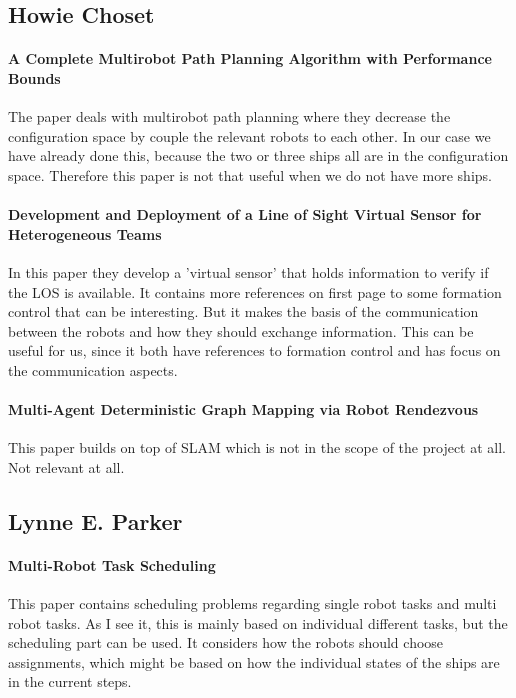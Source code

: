 \subsection{Howie Choset}

{\vskip0pt\color{gray}
\paragraph{A Complete Multirobot Path Planning Algorithm with Performance Bounds}
The paper deals with multirobot path planning where they decrease the configuration space by couple the relevant robots to each other. In our case we have already done this, because the two or three ships all are in the configuration space.
Therefore this paper is not that useful when we do not have more ships.}

\paragraph{Development and Deployment of a Line of Sight Virtual Sensor for Heterogeneous Teams }
In this paper they develop a 'virtual sensor' that holds information to verify if the LOS is available. It contains more references on first page to some formation control that can be interesting. But it makes the basis of the communication between the robots and how they should exchange information.
This can be useful for us, since it both have references to formation control and has focus on the communication aspects.

{\vskip0pt\color{gray}
\paragraph{Multi-Agent Deterministic Graph Mapping via Robot Rendezvous }
This paper builds on top of SLAM which is not in the scope of the project at all.
Not relevant at all.}


\subsection{Lynne E. Parker}

\paragraph{Multi-Robot Task Scheduling}
This paper contains scheduling problems regarding single robot tasks and multi robot tasks. As I see it, this is mainly based on individual different tasks, but the scheduling part can be used. It considers how the robots should choose assignments, which might be based on how the individual states of the ships are in the current steps.

